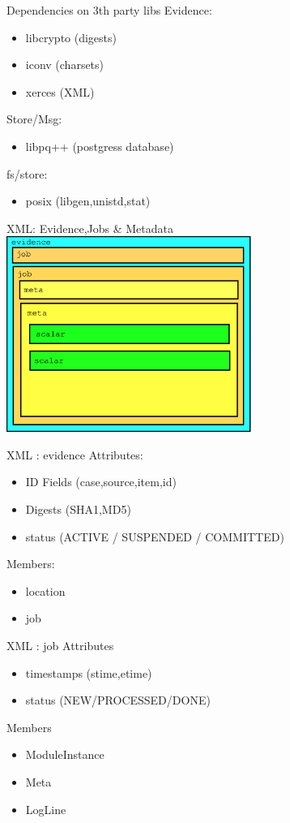 \documentclass[pdf,contemporain,slideColor,colorBG,accumulate,nototal,capsules]{prosper}
\begin{document}
\begin{slide}{Dependencies on 3th party libs}
  Evidence:
  \begin{itemize}
    \item libcrypto (digests)
    \item iconv (charsets)
    \item xerces (XML)
  \end{itemize}
  Store/Msg:
  \begin{itemize}
     \item libpq++ (postgress database)
  \end{itemize}
  fs/store:
  \begin{itemize}
    \item posix (libgen,unistd,stat)
  \end{itemize}
\end{slide}
\begin{slide}{XML: Evidence,Jobs \& Metadata}
\includegraphics[width=8cm]{dia6.eps}
\end{slide}
\begin{slide}{XML : evidence}
Attributes:
  \begin{itemize}
  \item ID Fields (case,source,item,id)
  \item Digests (SHA1,MD5)
  \item status (ACTIVE / SUSPENDED / COMMITTED)
  \end{itemize}
Members:
  \begin{itemize}
  \item location
  \item job
  \end{itemize}
\end{slide}
\begin{slide}{XML : job}
Attributes
\begin{itemize}
\item timestamps (stime,etime)
\item status (NEW/PROCESSED/DONE)
\end{itemize}
Members
\begin{itemize}
\item ModuleInstance
\item Meta
\item LogLine
\end{itemize}
\end{slide}
\end{document}
